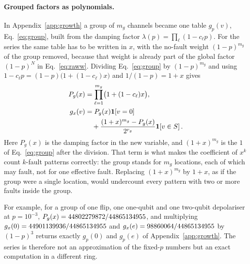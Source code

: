 \paragraph{Grouped factors as polynomials.} In Appendix~\ref{app:growth} a group of $m_g$ channels became one table $g_p(v)$, Eq.~\eqref{eq:group}, built from the damping factor $\lambda(p)=\prod_\ell(1-c_\ell p)$. For the series the same table has to be written in $x$, with the no-fault weight $(1-p)^{m_g}$ of the group removed, because that weight is already part of the global factor $(1-p)^N$ in Eq.~\eqref{eq:raww}. Dividing Eq.~\eqref{eq:group} by $(1-p)^{m_g}$ and using $1-c_\ell p=(1-p)\bigl(1+(1-c_\ell)x\bigr)$ and $1/(1-p)=1+x$ gives
\begin{equation}
 \begin{aligned}
 P_g(x)&=\prod_{\ell=1}^{m_g}\bigl(1+(1-c_\ell)x\bigr),\\
 g_x(v)&=P_g(x)\mathbf1\!\left[v=0\right]\\
       &\quad+\frac{(1+x)^{m_g}-P_g(x)}{2^{r_g}}\mathbf1\!\left[v\in S\right].
 \end{aligned}
 \label{eq:polygroup}
\end{equation}
Here $P_g(x)$ is the damping factor in the new variable, and $(1+x)^{m_g}$ is the $1$ of Eq.~\eqref{eq:group} after the division. That term is what makes the coefficient of $x^k$ count $k$-fault patterns correctly: the group stands for $m_g$ locations, each of which may fault, not for one effective fault. Replacing $(1+x)^{m_g}$ by $1+x$, as if the group were a single location, would undercount every pattern with two or more faults inside the group.

For example, for a group of one flip, one one-qubit and one two-qubit depolariser at $p=10^{-3}$, $P_g(x)=44802279872/44865134955$, and multiplying $g_x(0)=44901139936/44865134955$ and $g_x(e)=98860064/44865134955$ by $(1-p)^3$ returns exactly $g_p(0)$ and $g_p(e)$ of Appendix~\ref{app:growth}. The series is therefore not an approximation of the fixed-$p$ numbers but an exact computation in a different ring.

